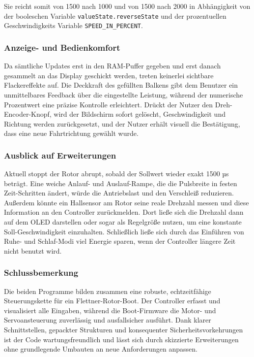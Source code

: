 \documentclass[a4paper,12pt]{article}
\begin{document}
Sie reicht somit von 1500 nach 1000 und von 1500 nach 2000 in Abhängigkeit von der booleschen Variable \texttt{valueState.reverseState} und der prozentuellen Geschwindigkeits Variable \texttt{SPEED\_IN\_PERCENT}.


\subsubsection{Anzeige- und Bedienkomfort}
Da sämtliche Updates erst in den RAM-Puffer gegeben und erst danach gesammelt an das Display geschickt werden, treten keinerlei sichtbare Flackereffekte auf. Die Deckkraft des gefüllten Balkens gibt dem Benutzer ein unmittelbares Feedback über die eingestellte Leistung, während der numerische Prozentwert eine präzise Kontrolle erleichtert. Drückt der Nutzer den Dreh-Encoder-Knopf, wird der Bildschirm sofort gelöscht, Geschwindigkeit und Richtung werden zurückgesetzt, und der Nutzer erhält visuell die Bestätigung, dass eine neue Fahrtrichtung gewählt wurde.

\subsubsection{Ausblick auf Erweiterungen}
Aktuell stoppt der Rotor abrupt, sobald der Sollwert wieder exakt 1500 µs beträgt. Eine weiche Anlauf- und Auslauf-Rampe, die die Pulsbreite in festen Zeit-Schritten ändert, würde die Antriebslast und den Verschleiß reduzieren. Außerdem könnte ein Hallsensor am Rotor seine reale Drehzahl messen und diese Information an den Controller zurückmelden. Dort ließe sich die Drehzahl dann auf dem OLED darstellen oder sogar als Regelgröße nutzen, um eine konstante Soll-Geschwindigkeit einzuhalten. Schließlich ließe sich durch das Einführen von Ruhe- und Schlaf-Modi viel Energie sparen, wenn der Controller längere Zeit nicht benutzt wird.

\subsubsection{Schlussbemerkung}
Die beiden Programme bilden zusammen eine robuste, echtzeitfähige Steuerungskette für ein Flettner-Rotor-Boot. Der Controller erfasst und visualisiert alle Eingaben, während die Boot-Firmware die Motor- und Servoansteuerung zuverlässig und ausfallsicher ausführt. Dank klarer Schnittstellen, gepackter Strukturen und konsequenter Sicherheitsvorkehrungen ist der Code wartungsfreundlich und lässt sich durch skizzierte Erweiterungen ohne grundlegende Umbauten an neue Anforderungen anpassen.
\end{document}

